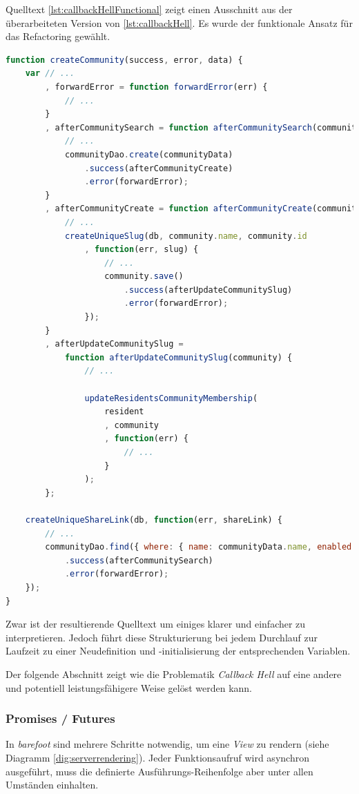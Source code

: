 Quelltext \ref{lst:callbackHellFunctional} zeigt einen Ausschnitt aus der überarbeiteten Version von \ref{lst:callbackHell}. Es wurde der funktionale Ansatz für das Refactoring gewählt.

\begin{lstlisting}[language=JavaScript, firstnumber=192, caption={Ausschnitt aus dem neusten Community Controller \cite{masterCommunityController}}, label={lst:callbackHellFunctional}]
function createCommunity(success, error, data) {
	var // ...
		, forwardError = function forwardError(err) {
			// ...
		}
		, afterCommunitySearch = function afterCommunitySearch(community) {
			// ...
			communityDao.create(communityData)
				.success(afterCommunityCreate)
				.error(forwardError);
		}
		, afterCommunityCreate = function afterCommunityCreate(community) {
			// ...
			createUniqueSlug(db, community.name, community.id
				, function(err, slug) {
					// ...
					community.save()
						.success(afterUpdateCommunitySlug)
						.error(forwardError);
				});
		}
		, afterUpdateCommunitySlug =
			function afterUpdateCommunitySlug(community) {
				// ...

				updateResidentsCommunityMembership(
					resident
					, community
					, function(err) {
						// ...
					}
				);
		};

	createUniqueShareLink(db, function(err, shareLink) {
		// ...
		communityDao.find({ where: { name: communityData.name, enabled: true }})
			.success(afterCommunitySearch)
			.error(forwardError);
	});
}
\end{lstlisting}

Zwar ist der resultierende Quelltext um einiges klarer und einfacher zu interpretieren. Jedoch führt diese Strukturierung bei jedem Durchlauf zur Laufzeit zu einer Neudefinition und -initialisierung der entsprechenden Variablen.

Der folgende Abschnitt zeigt wie die Problematik \emph{Callback Hell} auf eine andere und potentiell leistungsfähigere Weise gelöst werden kann.


\subsubsection*{Promises / Futures}

In \emph{barefoot} sind mehrere Schritte notwendig, um eine \emph{View} zu rendern (siehe Diagramm \ref{dig:serverrendering}).
Jeder Funktionsaufruf wird asynchron ausgeführt, muss die definierte Ausführungs-Reihenfolge aber unter allen Umständen einhalten.

